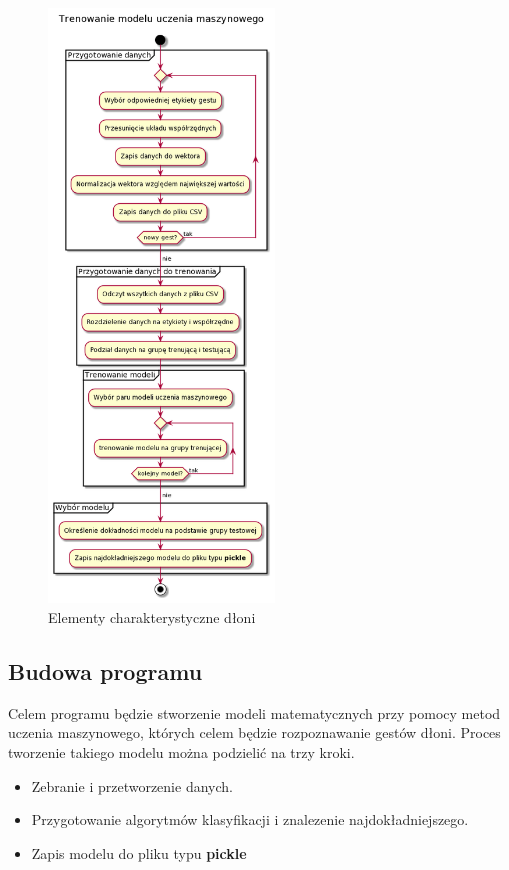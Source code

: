     \begin{figure}[H]
        \begin{center}
            \includegraphics[width=6cm]{../images/machine_learning_gestures.png}
            \caption{Elementy charakterystyczne dłoni}
        \end{center}
    \end{figure}

    \subsection{Budowa programu}
    Celem programu będzie stworzenie modeli matematycznych przy pomocy metod uczenia maszynowego, których celem będzie rozpoznawanie gestów dłoni. Proces tworzenie takiego modelu można podzielić na trzy kroki.
    
    \begin{itemize}
        \item Zebranie i przetworzenie danych. 
        \item Przygotowanie algorytmów klasyfikacji i znalezenie najdokładniejszego. 
        \item Zapis modelu do pliku typu \textbf{pickle}
    \end{itemize}
    
